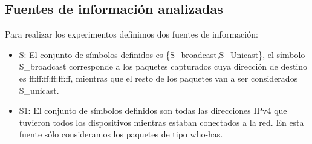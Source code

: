 \subsection{Fuentes de información analizadas}
Para realizar los experimentos definimos dos fuentes de información:
\begin{itemize}
\item S: El conjunto de símbolos definidos es \{S_{broadcast},S_{Unicast}\}, el símbolo S_{broadcast} corresponde a los paquetes capturados cuya dirección de destino es ff:ff:ff:ff:ff:ff, mientras que el resto de los paquetes van a ser considerados S_{unicast}.
\item S1: El conjunto de símbolos definidos son todas las direcciones IPv4 que tuvieron todos los dispositivos mientras estaban conectados a la red. En esta fuente sólo consideramos los paquetes de tipo who-has.
\end{itemize}

